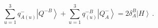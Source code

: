 \begin{equation}
\sum_{u=1}^3q^-_{A(u)}\left|Q^{-B}\right>+
\sum_{u=1}^3q^{-B}_{(u)}\left|Q^-_A\right>=2\delta_A^B\left|H\right>\,.
\end{equation}

